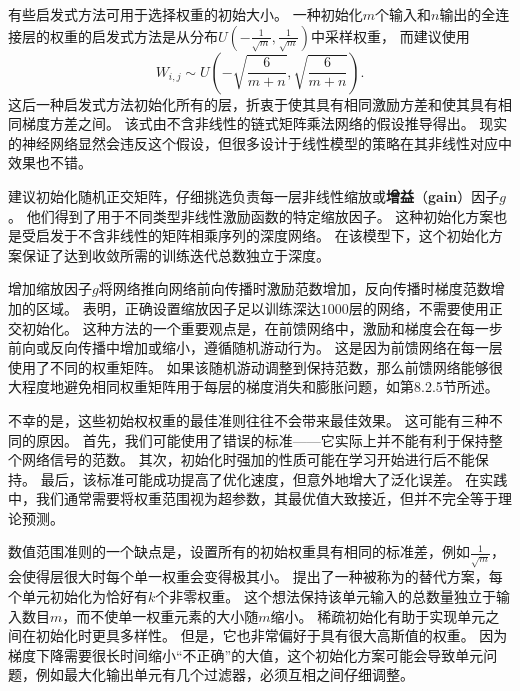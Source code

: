 有些启发式方法可用于选择权重的初始大小。
一种初始化$m$个输入和$n$输出的全连接层的权重的启发式方法是从分布$U(-\frac{1}{\sqrt{m}}, \frac{1}{\sqrt{m}})$中采样权重，
而\cite{Glorot+al-AI-2011-small}建议使用
\begin{equation}
    W_{i,j} \sim U \left(-\sqrt{\frac{6}{m+n}}, \sqrt{\frac{6}{m+n}}\right) .
\end{equation}
这后一种启发式方法初始化所有的层，折衷于使其具有相同激励方差和使其具有相同梯度方差之间。
该式由不含非线性的链式矩阵乘法网络的假设推导得出。
现实的神经网络显然会违反这个假设，但很多设计于线性模型的策略在其非线性对应中效果也不错。


\cite{Saxe-et-al-ICLR13}建议初始化随机正交矩阵，仔细挑选负责每一层非线性缩放或\textbf{增益}（\textbf{gain}）因子$g$。
他们得到了用于不同类型非线性激励函数的特定缩放因子。
这种初始化方案也是受启发于不含非线性的矩阵相乘序列的深度网络。
在该模型下，这个初始化方案保证了达到收敛所需的训练迭代总数独立于深度。

增加缩放因子$g$将网络推向网络前向传播时激励范数增加，反向传播时梯度范数增加的区域。
\cite{Sussillo14}表明，正确设置缩放因子足以训练深达$1000$层的网络，不需要使用正交初始化。
这种方法的一个重要观点是，在前馈网络中，激励和梯度会在每一步前向或反向传播中增加或缩小，遵循随机游动行为。
这是因为前馈网络在每一层使用了不同的权重矩阵。
如果该随机游动调整到保持范数，那么前馈网络能够很大程度地避免相同权重矩阵用于每层的梯度消失和膨胀问题，如第8.2.5节所述。

不幸的是，这些初始权权重的最佳准则往往不会带来最佳效果。
这可能有三种不同的原因。
首先，我们可能使用了错误的标准——它实际上并不能有利于保持整个网络信号的范数。
其次，初始化时强加的性质可能在学习开始进行后不能保持。
最后，该标准可能成功提高了优化速度，但意外地增大了泛化误差。
在实践中，我们通常需要将权重范围视为超参数，其最优值大致接近，但并不完全等于理论预测。


数值范围准则的一个缺点是，设置所有的初始权重具有相同的标准差，例如$\frac{1}{\sqrt{m}}$，会使得层很大时每个单一权重会变得极其小。
\cite{martens2010hessian-small}提出了一种被称为的替代方案，每个单元初始化为恰好有$k$个非零权重。
这个想法保持该单元输入的总数量独立于输入数目$m$，而不使单一权重元素的大小随$m$缩小。
稀疏初始化有助于实现单元之间在初始化时更具多样性。
但是，它也非常偏好于具有很大高斯值的权重。
因为梯度下降需要很长时间缩小``不正确''的大值，这个初始化方案可能会导致单元问题，例如最大化输出单元有几个过滤器，必须互相之间仔细调整。

